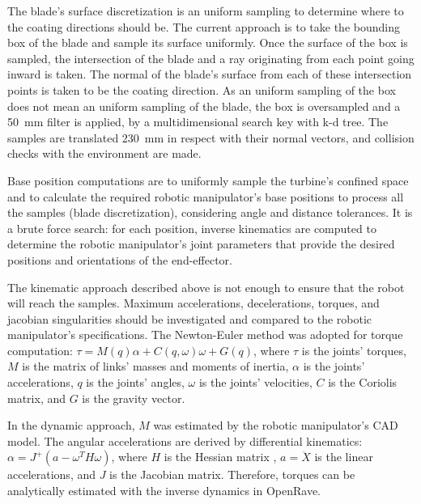 The blade's surface discretization is an uniform sampling to
determine where to the coating directions should be. The current approach is to
take the bounding box of the blade and sample its surface uniformly. Once the
surface of the box is sampled, the intersection of the blade and a ray
originating from each point going inward is taken. The normal of the blade's
surface from each of these intersection points is taken to be the coating
direction. As an uniform sampling of the box does not mean an uniform sampling
of the blade, the box is oversampled and a 50~mm filter is applied, by a multidimensional search key with k-d tree.
The samples are translated 230~mm in respect with their normal vectors,
and collision checks with the environment are made. 

Base position computations are to uniformly sample the turbine's
confined space and to calculate the required robotic manipulator's base
positions to process all the samples (blade discretization),  considering angle
and distance tolerances. It is a brute force search: for each position, inverse
kinematics are computed to determine the robotic manipulator's joint parameters that provide
the desired positions and orientations of the end-effector.

The kinematic approach described above is not enough to ensure that the robot
will reach the samples. Maximum accelerations, decelerations,
torques, and jacobian singularities should be investigated and compared to the robotic
manipulator's specifications. The Newton-Euler method
\cite{sciavicco2000differential} was adopted for torque computation: $\tau =
M(q)\alpha + C(q,\omega)\omega + G(q)$, where $\tau$ is the joints' torques,
$M$ is the matrix of links' masses and moments of inertia, $\alpha$ is the
joints' accelerations, $q$ is the joints' angles, $\omega$ is the joints'
velocities, $C$ is the Coriolis matrix, and $G$ is the gravity vector.

In the dynamic approach, $M$ was estimated by the robotic manipulator's CAD
model. The angular accelerations are derived by differential kinematics:
$\alpha=J^+(a-\omega^TH\omega)$, where $H$ is the Hessian matrix
\cite{hourtash2005kinematic}, $a=\ddot{X}$ is the linear accelerations, and $J$
is the Jacobian matrix. Therefore, torques can be analytically estimated with
the inverse dynamics in OpenRave. 

